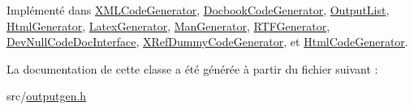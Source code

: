 Implémenté dans \hyperlink{class_x_m_l_code_generator_afe5258b3e63958ce81ce4895d9ce2334}{X\+M\+L\+Code\+Generator}, \hyperlink{class_docbook_code_generator_a5ce309cd68be3ce9eabbd2e522c1c286}{Docbook\+Code\+Generator}, \hyperlink{class_output_list_a3cebc68a6a4524ef4b78c4e81d5127eb}{Output\+List}, \hyperlink{class_html_generator_ad21a9b170d8f644619f287a233c6b549}{Html\+Generator}, \hyperlink{class_latex_generator_aa25f1930cd87edac4db7452bddb05825}{Latex\+Generator}, \hyperlink{class_man_generator_a8ec440b278091bf61579f35cd8237a25}{Man\+Generator}, \hyperlink{class_r_t_f_generator_a06e0455dd78d9d79ea51e6d31e6877fe}{R\+T\+F\+Generator}, \hyperlink{class_dev_null_code_doc_interface_a3f251d7e2651aa943adf84c35e27d094}{Dev\+Null\+Code\+Doc\+Interface}, \hyperlink{class_x_ref_dummy_code_generator_ab174d5a290293c32246eb01ccb937645}{X\+Ref\+Dummy\+Code\+Generator}, et \hyperlink{class_html_code_generator_a6edc5ab4a379a6edfaac4e4c36db4178}{Html\+Code\+Generator}.



La documentation de cette classe a été générée à partir du fichier suivant \+:\begin{DoxyCompactItemize}
\item 
src/\hyperlink{outputgen_8h}{outputgen.\+h}\end{DoxyCompactItemize}
